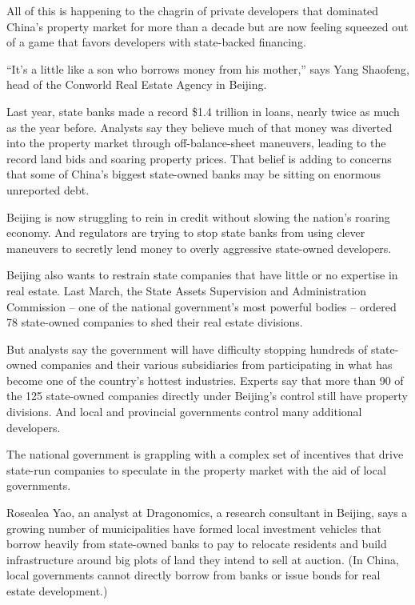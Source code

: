 ﻿\documentclass[12pt]{article}
\begin{document}
All of this is happening to the chagrin of private developers that dominated China's property market
for more than a decade but are now feeling squeezed out of a game that favors developers with
state-backed financing.

``It's a little like a son who borrows money from his mother,'' says Yang Shaofeng, head of the
Conworld Real Estate Agency in Beijing.

Last year, state banks made a record \$1.4 trillion in loans, nearly twice as much as the year
before. Analysts say they believe much of that money was diverted into the property market through
off-balance-sheet maneuvers, leading to the record land bids and soaring property prices. That
belief is adding to concerns that some of China's biggest state-owned banks may be sitting on
enormous unreported debt.

Beijing is now struggling to rein in credit without slowing the nation's roaring economy. And
regulators are trying to stop state banks from using clever maneuvers to secretly lend money to
overly aggressive state-owned developers.

Beijing also wants to restrain state companies that have little or no expertise in real estate. Last
March, the State Assets Supervision and Administration Commission -- one of the national
government's most powerful bodies -- ordered 78 state-owned companies to shed their real estate
divisions.

But analysts say the government will have difficulty stopping hundreds of state-owned companies and
their various subsidiaries from participating in what has become one of the country's hottest
industries. Experts say that more than 90 of the 125 state-owned companies directly under Beijing's
control still have property divisions. And local and provincial governments control many additional
developers.

The national government is grappling with a complex set of incentives that drive state-run companies
to speculate in the property market with the aid of local governments.

Rosealea Yao, an analyst at Dragonomics, a research consultant in Beijing, says a growing number of
municipalities have formed local investment vehicles that borrow heavily from state-owned banks to
pay to relocate residents and build infrastructure around big plots of land they intend to sell at
auction. (In China, local governments cannot directly borrow from banks or issue bonds for real
estate development.)
\end{document}
